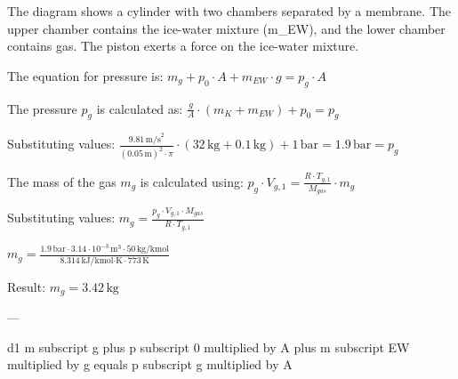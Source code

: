 The diagram shows a cylinder with two chambers separated by a membrane. The upper chamber contains the ice-water mixture (m_EW), and the lower chamber contains gas. The piston exerts a force on the ice-water mixture.  

The equation for pressure is:  
\( m_g + p_0 \cdot A + m_{EW} \cdot g = p_g \cdot A \)  

The pressure \( p_g \) is calculated as:  
\( \frac{g}{A} \cdot (m_K + m_{EW}) + p_0 = p_g \)  

Substituting values:  
\( \frac{9.81 \, \text{m/s}^2}{(0.05 \, \text{m})^2 \cdot \pi} \cdot (32 \, \text{kg} + 0.1 \, \text{kg}) + 1 \, \text{bar} = 1.9 \, \text{bar} = p_g \)  

The mass of the gas \( m_g \) is calculated using:  
\( p_g \cdot V_{g,1} = \frac{R \cdot T_{g,1}}{M_{gas}} \cdot m_g \)  

Substituting values:  
\( m_g = \frac{p_g \cdot V_{g,1} \cdot M_{gas}}{R \cdot T_{g,1}} \)  

\( m_g = \frac{1.9 \, \text{bar} \cdot 3.14 \cdot 10^{-3} \, \text{m}^3 \cdot 50 \, \text{kg/kmol}}{8.314 \, \text{kJ/kmol·K} \cdot 773 \, \text{K}} \)  

Result: \( m_g = 3.42 \, \text{kg} \)  

---

d1 m subscript g plus p subscript 0 multiplied by A plus m subscript EW multiplied by g equals p subscript g multiplied by A